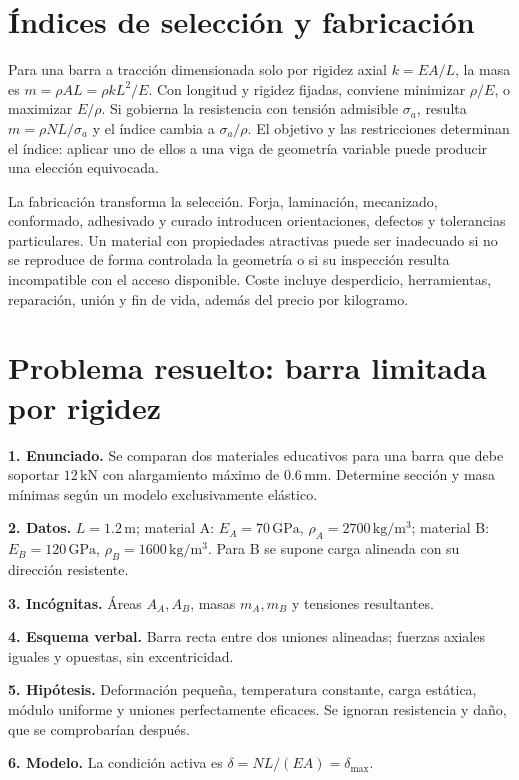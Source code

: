 \section{Índices de selección y fabricación}
Para una barra a tracción dimensionada solo por rigidez axial $k=EA/L$, la masa es $m=\rho AL=\rho kL^2/E$. Con longitud y rigidez fijadas, conviene minimizar $\rho/E$, o maximizar $E/\rho$. Si gobierna la resistencia con tensión admisible $\sigma_a$, resulta $m=\rho NL/\sigma_a$ y el índice cambia a $\sigma_a/\rho$. El objetivo y las restricciones determinan el índice: aplicar uno de ellos a una viga de geometría variable puede producir una elección equivocada.

La fabricación transforma la selección. Forja, laminación, mecanizado, conformado, adhesivado y curado introducen orientaciones, defectos y tolerancias particulares. Un material con propiedades atractivas puede ser inadecuado si no se reproduce de forma controlada la geometría o si su inspección resulta incompatible con el acceso disponible. Coste incluye desperdicio, herramientas, reparación, unión y fin de vida, además del precio por kilogramo.

\section{Problema resuelto: barra limitada por rigidez}
\textbf{1. Enunciado.} Se comparan dos materiales educativos para una barra que debe soportar $12\,\mathrm{kN}$ con alargamiento máximo de $0.6\,\mathrm{mm}$. Determine sección y masa mínimas según un modelo exclusivamente elástico.

\textbf{2. Datos.} $L=1.2\,\mathrm{m}$; material A: $E_A=70\,\mathrm{GPa}$, $\rho_A=2700\,\mathrm{kg/m^3}$; material B: $E_B=120\,\mathrm{GPa}$, $\rho_B=1600\,\mathrm{kg/m^3}$. Para B se supone carga alineada con su dirección resistente.

\textbf{3. Incógnitas.} Áreas $A_A,A_B$, masas $m_A,m_B$ y tensiones resultantes.

\textbf{4. Esquema verbal.} Barra recta entre dos uniones alineadas; fuerzas axiales iguales y opuestas, sin excentricidad.

\textbf{5. Hipótesis.} Deformación pequeña, temperatura constante, carga estática, módulo uniforme y uniones perfectamente eficaces. Se ignoran resistencia y daño, que se comprobarían después.

\textbf{6. Modelo.} La condición activa es $\delta=NL/(EA)=\delta_{\max}$.

